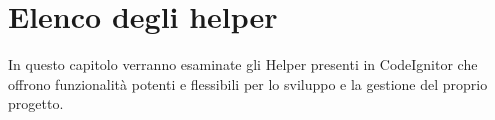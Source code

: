 \chapter{Elenco degli helper}
\label{cap:elencohelper}

In questo capitolo verranno esaminate gli Helper presenti in CodeIgnitor che offrono funzionalità potenti e flessibili per lo sviluppo e la gestione del proprio progetto.